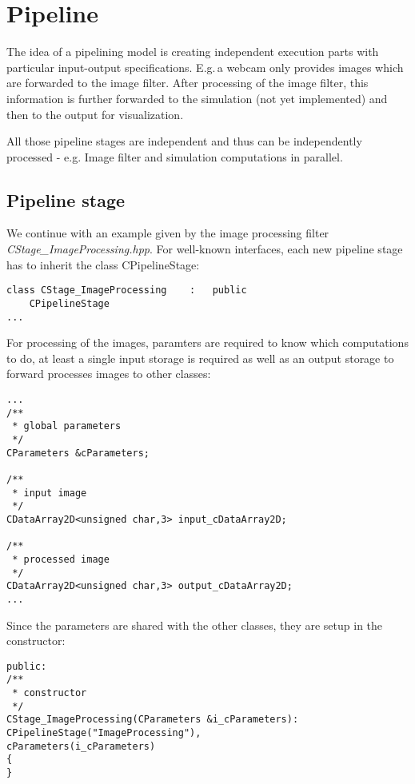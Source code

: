 \documentclass[11pt,a4paper]{article}
\begin{document}
\section{Pipeline}
\label{sec:pipeline}

The idea of a pipelining model is creating independent execution parts with
particular input-output specifications.
E.g.\,a webcam only provides images which are forwarded to the image filter.
After processing of the image filter, this information is further forwarded to
the simulation (not yet implemented) and then to the output for visualization.

All those pipeline stages are independent and thus can be independently
processed - e.g. Image filter and simulation computations in parallel.

%
\subsection{Pipeline stage}

We continue with an example given by the image processing filter
\textit{CStage\_ImageProcessing.hpp}.
For well-known interfaces, each new pipeline stage has to inherit the class
CPipelineStage:

\begin{lstlisting}
class CStage_ImageProcessing	:	public
	CPipelineStage
...
\end{lstlisting}

\noindent
For processing of the images, paramters are required to know which
computations to do, at least a single input storage is required as well as an
output storage to forward processes images to other classes:

\begin{lstlisting}
...
/**
 * global parameters
 */
CParameters &cParameters;

/**
 * input image
 */
CDataArray2D<unsigned char,3> input_cDataArray2D;

/**
 * processed image
 */
CDataArray2D<unsigned char,3> output_cDataArray2D;
...
\end{lstlisting}

\noindent
Since the parameters are shared with the other classes, they are
setup in the constructor:

\begin{lstlisting}
public:
/**
 * constructor
 */
CStage_ImageProcessing(CParameters &i_cParameters):
CPipelineStage("ImageProcessing"),
cParameters(i_cParameters)
{
}
\end{lstlisting}
\end{document}
